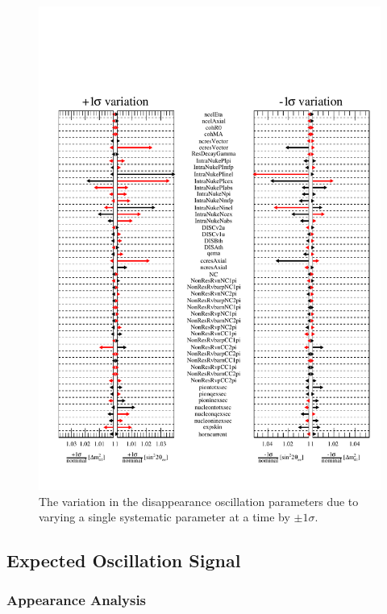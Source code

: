 \begin{figure}[h!]
    \centering
    \includegraphics[width = \largefigwidth]{figures-chap6/star_plot/nue_dsisapp_pulls.pdf}
    \caption[\nue disappearance oscillation parameter pulls due to varying a single systematic parameter by $\pm1\sigma$.]{The variation in the \nue disappearance oscillation parameters due to varying a single systematic parameter at a time by $\pm1\sigma$.}
    \label{fig:nue_disapp_osc_param_pulls}
\end{figure}


\clearpage


\subsection{Expected Oscillation Signal}

\subsubsection{\texorpdfstring{\nue Appearance Analysis}{nue Appearance Analysis}}\label{sec:nue_app}

